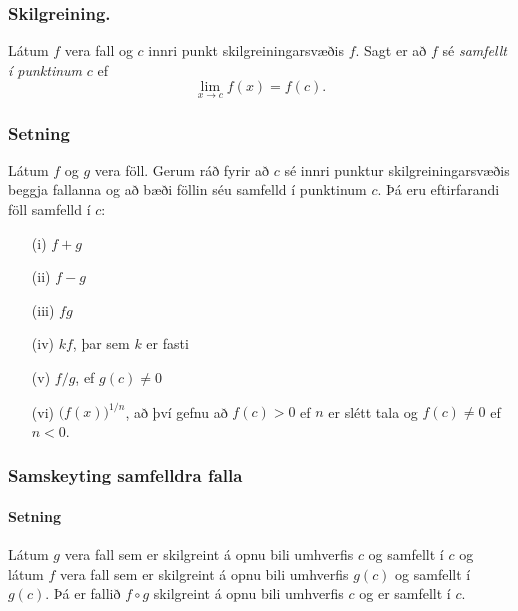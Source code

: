 \documentclass[icelandic,a4paper,12pt]{article}
\begin{document}
\pause



\subsubsection*{Skilgreining.}
Látum $f$ vera fall og $c$ innri punkt skilgreiningarsvæðis $f$.  Sagt
er að $f$ sé {\em samfellt í punktinum} $c$ ef
$$\lim_{x\rightarrow c}f(x)=f(c).$$



\subsubsection*{Setning}
 Látum $f$ og $g$ vera föll.  Gerum ráð fyrir að $c$ sé innri punktur
skilgreiningarsvæðis beggja fallanna og að bæði föllin séu samfelld í
punktinum $c$.  Þá eru eftirfarandi föll samfelld í $c$:
\begin{itemize}
\pause
\item[(i)] $f+g$ %
\pause
\item[(ii)] $f-g$
\pause
\item[(iii)] $fg$
\pause
\item[(iv)] $kf$, þar sem $k$ er fasti
\pause
\item[(v)]  $f/g$, ef $g(c)\neq 0$
\pause
\item[(vi)]  $\Big(f(x)\Big)^{1/n}$, að því gefnu að 
$f(c)>0$ ef $n$ er slétt tala og $f(c)\neq 0$ ef $n<0$.
\end{itemize} 



\subsubsection*{Samskeyting samfelldra falla}
 \paragraph{Setning}
 Látum $g$ vera fall sem er skilgreint á opnu bili umhverfis $c$ og
samfellt í $c$ og látum $f$ vera fall sem er skilgreint á opnu bili
umhverfis $g(c)$ og samfellt í $g(c)$.  Þá er fallið $f\circ g$
skilgreint á opnu bili umhverfis $c$ og er samfellt í $c$.  
% 
 
\end{document}
